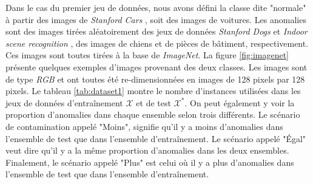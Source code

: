 Dans le cas du premier jeu de données, nous avons défini la classe dite "normale" à partir des images de \textit{Stanford Cars} \citep{KrauseStarkDengFei-Fei_3DRR2013}, soit des images de voitures. Les anomalies sont des images tirées aléatoirement des jeux de données \textit{Stanford Dogs} \citep{KhoslaYaoJayadevaprakashFeiFei_FGVC2011} et \textit{Indoor scene recognition} \citep{5206537}, des images de chiens et de pièces de bâtiment, respectivement. Ces images sont toutes tirées à la base de \textit{ImageNet}. La figure \ref{fig:imagenet} présente quelques exemples d'images provenant des deux classes. Les images sont de type \textit{RGB} et ont toutes été re-dimensionnées en images de 128 pixels par 128 pixels. Le tableau \ref{tab:dataset1} montre le nombre d'instances utilisées dans les jeux de données d'entraînement $\mathcal{X}$ et de test $\mathcal{X^*}$. On peut également y voir la proportion d'anomalies dans chaque ensemble selon trois \DIFdelbegin {}\DIFdelend \DIFaddbegin {}\DIFaddend différents. Le scénario de contamination appelé "Moins", signifie qu'il y a moins d'anomalies dans l'ensemble de test que dans l'ensemble d'entraînement. Le scénario appelé "Égal" veut dire qu'il y a la même proportion d'anomalies dans les deux ensembles. Finalement, le scénario appelé "Plus" est celui où il y a plus d'anomalies dans l'ensemble de test que dans l'ensemble d'entraînement.

